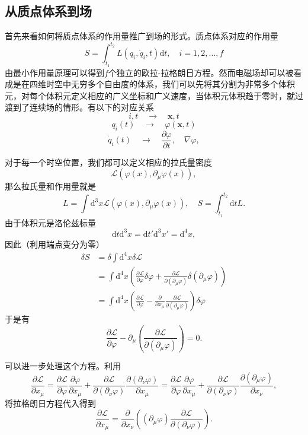 \documentclass[UTF8]{ctexbook}
\renewcommand{\d}{\mathrm{d}}
\renewcommand{\b}{\boldsymbol}
\numberwithin{equation}{chapter}
\begin{document}
	\subsection{从质点体系到场}
	首先来看如何将质点体系的作用量推广到场的形式。质点体系对应的作用量
	\[S=\int_{t_1}^{t_2}L(q_i,\dot{q}_i,t)\d t,\quad i=1,2,\dots ,f\]
	由最小作用量原理可以得到$f$个独立的欧拉-拉格朗日方程。然而电磁场却可以被看成是在四维时空中无穷多个自由度的体系，我们可以先将其分割为非常多个体积元，对每个体积元定义相应的广义坐标和广义速度，当体积元体积趋于零时，就过渡到了连续场的情形。有以下的对应关系
	\[i,t\quad \rightarrow \quad \b{x},t\]
	\[q_i(t)\quad \rightarrow \quad \varphi(\b{x},t)\]
	\[\dot{q}_i(t) \quad \rightarrow \quad \frac{\partial \varphi}{\partial t},\quad \nabla\varphi,\]
	
	对于每一个时空位置，我们都可以定义相应的拉氏量密度
	\[\mathcal{L}(\varphi(x),\partial_\mu \varphi(x)),\]
	那么拉氏量和作用量就是
	\[L=\int \d^3 x \mathcal{L}(\varphi(x),\partial_\mu \varphi(x)),\quad S=\int_{t_1}^{t_2} \d t L.\]
	由于体积元是洛伦兹标量
	\[\d t \d^3 x= \d t' \d^3 x'=\d^4 x, \]
	因此（利用端点变分为零）
	\begin{align*}
		\delta S&=\delta \int \d^4 x \delta \mathcal{L} \\
		&=\int \d^4 x\left(\frac{\partial \mathcal{L}}{\partial \varphi}\delta \varphi+\frac{\partial \mathcal{L}}{\partial (\partial_\mu \varphi)}\delta(\partial_\mu \varphi)\right) \\
		&=\int \d^4 x\left(\frac{\partial \mathcal{L}}{\partial \varphi} - \frac{\partial }{\partial x_\mu}\frac{\partial \mathcal{L}}{\partial(\partial_\mu \varphi)} \right)\delta \varphi
	\end{align*}
	于是有
	\[\frac{\partial\mathcal{L}}{\partial \varphi}-\partial_\mu\left(\frac{\partial \mathcal{L}}{\partial (\partial_\mu \varphi)}\right)=0.\]
	
	可以进一步处理这个方程。利用
	\[\frac{\partial \mathcal{L}}{\partial x_\mu}=\frac{\partial \mathcal{L}}{\partial \varphi}\frac{\partial \varphi}{\partial x_\mu}+ \frac{\partial \mathcal{L}}{\partial (\partial_\nu \varphi)}\frac{\partial (\partial_\nu \varphi)}{\partial x_\mu}=\frac{\partial \mathcal{L}}{\partial \varphi}\frac{\partial \varphi}{\partial x_\mu}+ \frac{\partial \mathcal{L}}{\partial (\partial_\nu \varphi)}\frac{\partial (\partial_\mu \varphi)}{\partial x_\nu},\]
	将拉格朗日方程代入得到
	\[\frac{\partial \mathcal{L}}{\partial x_\mu}=\frac{\partial }{\partial x_\nu} \left((\partial_\mu \varphi)\frac{\partial \mathcal{L}}{\partial (\partial_\nu \varphi)}\right).\]
	
\end{document}

